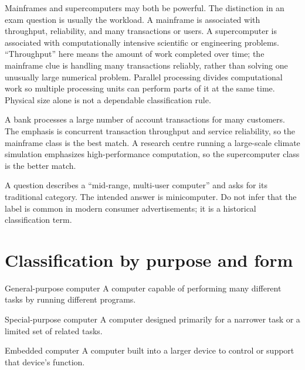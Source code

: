 Mainframes and supercomputers may both be powerful. The distinction in an
exam question is usually the workload. A mainframe is associated with
throughput, reliability, and many transactions or users. A supercomputer is
associated with computationally intensive scientific or engineering
problems. ``Throughput'' here means the amount of work completed over time;
the mainframe clue is handling many transactions reliably, rather than
solving one unusually large numerical problem. Parallel processing divides
computational work so multiple processing units can perform parts of it at
the same time. Physical size alone is not a dependable classification rule.

\begin{example}
A bank processes a large number of account transactions for many customers.
The emphasis is concurrent transaction throughput and service reliability,
so the mainframe class is the best match. A research centre running a
large-scale climate simulation emphasizes high-performance computation, so
the supercomputer class is the better match.
\end{example}

\begin{example}
A question describes a ``mid-range, multi-user computer'' and asks for its
traditional category. The intended answer is minicomputer. Do not infer that
the label is common in modern consumer advertisements; it is a historical
classification term.
\end{example}

\section{Classification by purpose and form}
\begin{definitionbox}{General-purpose computer}
A computer capable of performing many different tasks by running different
programs.
\end{definitionbox}

\begin{definitionbox}{Special-purpose computer}
A computer designed primarily for a narrower task or a limited set of
related tasks.
\end{definitionbox}

\begin{definitionbox}{Embedded computer}
A computer built into a larger device to control or support that device's
function.
\end{definitionbox}

